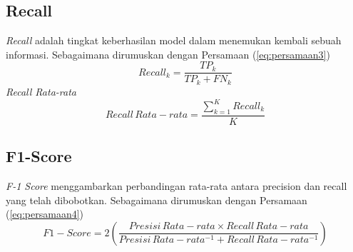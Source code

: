 \subsection{Recall}
\textit{Recall} adalah tingkat keberhasilan model dalam menemukan
kembali sebuah informasi. Sebagaimana dirumuskan dengan Persamaan (\ref{eq:persamaan3})
\begin{equation}\label{eq:persamaan4}
Recall_k=\frac{TP_k}{TP_k+FN_k}
\end{equation} 
{\it Recall Rata-rata}
\begin{equation}\label{eq:persamaan5}
Recall \, Rata-rata=\frac{\sum_{k=1}^K Recall_k}{K}
\end{equation} 
\subsection{F1-Score}
\textit{F-1 Score} menggambarkan perbandingan rata-rata antara precision dan recall yang telah dibobotkan. Sebagaimana dirumuskan dengan Persamaan (\ref{eq:persamaan4})
\begin{equation}\label{eq:persamaan6}
F1-Score=2 \left( \frac{Presisi \, Rata-rata \times Recall \, Rata-rata}{Presisi \, Rata-rata^{-1} + Recall \, Rata-rata^{-1}} \right)
\end{equation} 

